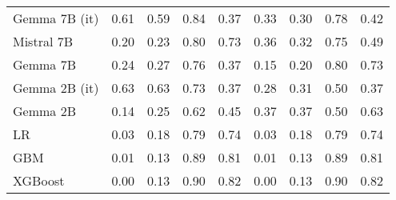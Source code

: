 \begin{tabular}{lllllllll}
Gemma 7B (it) & \cellcolor{orange!14.7} 0.61 & \cellcolor{orange!4.7} 0.59 & \cellcolor{cyan!3.8} 0.84 & \cellcolor{orange!25.0} 0.37 & 0.33 & 0.30 & 0.78 & 0.42 \\
Mistral 7B & 0.20 & 0.23 & 0.80 & 0.73 & \cellcolor{orange!15.7} 0.36 & 0.32 & 0.75 & 0.49 \\
Gemma 7B & 0.24 & 0.27 & 0.76 & \cellcolor{orange!25.0} 0.37 & 0.15 & 0.20 & 0.80 & 0.73 \\
Gemma 2B (it) & \cellcolor{orange!25.0} 0.63 & \cellcolor{orange!25.0} 0.63 & 0.73 & \cellcolor{orange!25.0} 0.37 & 0.28 & 0.31 & \cellcolor{orange!25.0} 0.50 & \cellcolor{orange!25.0} 0.37 \\
Gemma 2B & \cellcolor{cyan!25.0} 0.14 & 0.25 & \cellcolor{orange!25.0} 0.62 & 0.45 & \cellcolor{orange!25.0} 0.37 & \cellcolor{orange!25.0} 0.37 & \cellcolor{orange!25.0} 0.50 & 0.63 \\
LR & 0.03 & 0.18 & 0.79 & 0.74 & 0.03 & 0.18 & 0.79 & 0.74 \\
GBM & 0.01 & 0.13 & 0.89 & 0.81 & 0.01 & 0.13 & 0.89 & 0.81 \\
XGBoost & 0.00 & 0.13 & 0.90 & 0.82 & 0.00 & 0.13 & 0.90 & 0.82 \\
\bottomrule
\end{tabular}

